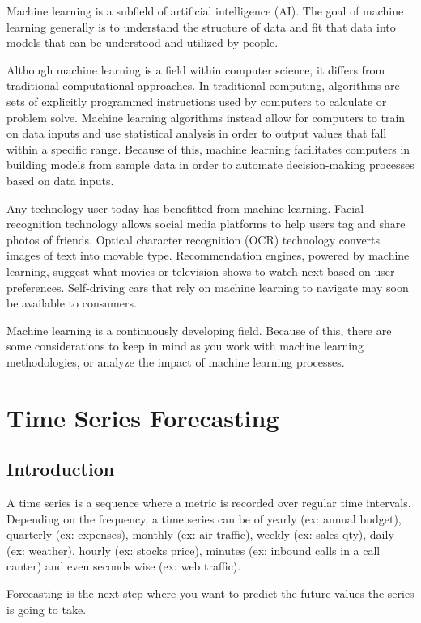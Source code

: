 \documentclass[12pt]{report}
\begin{document}
Machine learning is a subfield of artificial intelligence (AI). The goal of machine learning generally is to understand the structure of data and fit that data into models that can be understood and utilized by people.

Although machine learning is a field within computer science, it differs from traditional computational approaches. In traditional computing, algorithms are sets of explicitly programmed instructions used by computers to calculate or problem solve. Machine learning algorithms instead allow for computers to train on data inputs and use statistical analysis in order to output values that fall within a specific range. Because of this, machine learning facilitates computers in building models from sample data in order to automate decision-making processes based on data inputs.

Any technology user today has benefitted from machine learning. Facial recognition technology allows social media platforms to help users tag and share photos of friends. Optical character recognition (OCR) technology converts images of text into movable type. Recommendation engines, powered by machine learning, suggest what movies or television shows to watch next based on user preferences. Self-driving cars that rely on machine learning to navigate may soon be available to consumers.

Machine learning is a continuously developing field. Because of this, there are some considerations to keep in mind as you work with machine learning methodologies, or analyze the impact of machine learning processes.\cite{12}




\section{Time Series Forecasting}

\subsection{Introduction}
A time series is a sequence where a metric is recorded over regular time intervals.
Depending on the frequency, a time series can be of yearly (ex: annual budget), quarterly (ex: expenses), monthly (ex: air traffic), weekly (ex: sales qty), daily (ex: weather), hourly (ex: stocks price), minutes (ex: inbound calls in a call canter) and even seconds wise (ex: web traffic).

Forecasting is the next step where you want to predict the future values the series is going to take.
\end{document}
